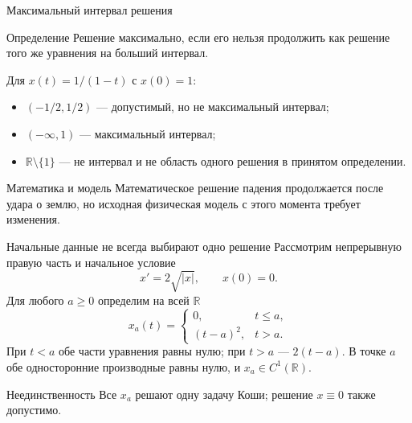 \documentclass[aspectratio=169,11pt]{beamer}
\newcommand{\R}{\mathbb R}
\begin{document}
\begin{frame}{Максимальный интервал решения}
  \begin{block}{Определение}
    Решение максимально, если его нельзя продолжить как решение
    того же уравнения на больший интервал.
  \end{block}
  Для $x(t)=1/(1-t)$ с $x(0)=1$:
  \begin{itemize}
    \item $(-1/2,1/2)$ --- допустимый, но не максимальный интервал;
    \item $(-\infty,1)$ --- максимальный интервал;
    \item $\R\setminus\{1\}$ --- не интервал и не область одного решения
      в принятом определении.
  \end{itemize}
  \begin{block}{Математика и модель}
    Математическое решение падения продолжается после удара о землю,
    но исходная физическая модель с этого момента требует изменения.
  \end{block}
\end{frame}

\begin{frame}{Начальные данные не всегда выбирают одно решение}
  Рассмотрим непрерывную правую часть и начальное условие
  \[
    x'=2\sqrt{|x|},\qquad x(0)=0.
  \]
  Для любого $a\ge0$ определим на всей $\R$
  \[
    x_a(t)=
    \begin{cases}
      0,&t\le a,\\
      (t-a)^2,&t>a.
    \end{cases}
  \]
  При $t<a$ обе части уравнения равны нулю; при $t>a$ --- $2(t-a)$.
  В точке $a$ обе односторонние производные равны нулю, и $x_a\in C^1(\R)$.
  \begin{alertblock}{Неединственность}
    Все $x_a$ решают одну задачу Коши; решение $x\equiv0$ также допустимо.
  \end{alertblock}
\end{frame}
\end{document}
